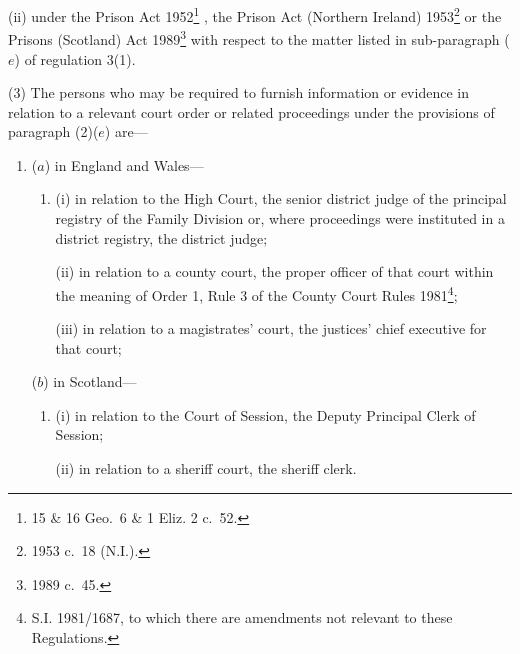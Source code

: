 \documentclass[a4paper,12pt]{article}
\begin{document}
\begin{enumerate}
\begin{enumerate}
(ii) under the Prison Act 1952\footnote{15 \& 16 Geo.\ 6 \& 1 Eliz. 2 c.\ 52.}%
, the Prison Act (Northern Ireland) 1953\footnote{1953 c.\ 18 (N.I.).} or the Prisons (Scotland) Act 1989\footnote{1989 c.\ 45.}  %
with respect to the matter listed in sub-paragraph ($e$)  of regulation 3(1).
\end{enumerate}
\end{enumerate}

(3) The persons who may be required to furnish information or evidence in relation to a relevant court order or related proceedings under the provisions of paragraph (2)($e$) are—
\begin{enumerate}\item[]
($a$) in England and Wales—
\begin{enumerate}\item[]
(i) in relation to the High Court, the senior district judge of the principal registry of the Family Division or, where proceedings were instituted in a district registry, the district judge;

(ii) in relation to a county court, the proper officer of that court within the meaning of Order 1, Rule 3 of the County Court Rules 1981\footnote{\frenchspacing S.I. 1981/1687, to which there are amendments not relevant to these Regulations.};

(iii) in relation to a magistrates' court, the 
justices' chief executive for  %
that court;
\end{enumerate}

($b$) in Scotland—
\begin{enumerate}\item[]
(i) in relation to the Court of Session, the Deputy Principal Clerk of Session;

(ii) in relation to a sheriff court, the sheriff clerk.
\end{enumerate}
\end{enumerate}
\end{document}
